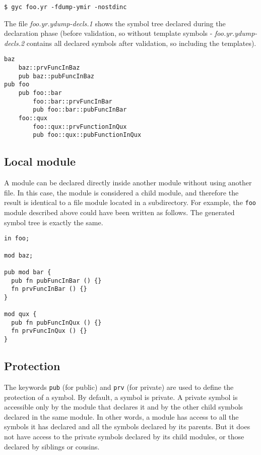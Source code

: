 \begin{lstlisting}[style=intermediateVerb]
$ gyc foo.yr -fdump-ymir -nostdinc
\end{lstlisting}

The file \textit{foo.yr.ydump-decls.1} shows the symbol tree declared during the
declaration phase (before validation, so without template symbols -
\textit{foo.yr.ydump-decls.2} contains all declared symbols after validation, so
including the templates).

\begin{lstlisting}[style=intermediateVerb]
baz
    baz::prvFuncInBaz
    pub baz::pubFuncInBaz
pub foo
    pub foo::bar
        foo::bar::prvFuncInBar
        pub foo::bar::pubFuncInBar
    foo::qux
        foo::qux::prvFunctionInQux
        pub foo::qux::pubFunctionInQux
\end{lstlisting}

\subsection{Local module}

A module can be declared directly inside another module without using another
file. In this case, the module is considered a child module, and therefore the
result is identical to a file module located in a subdirectory. For example, the
\texttt{foo} module described above could have been written as follows. The
generated symbol tree is exactly the same.

\begin{lstlisting}[caption=\textit{./foo.yr}, style=coloredverbatim]
in foo;

mod baz;

pub mod bar {
  pub fn pubFuncInBar () {}
  fn prvFuncInBar () {}
}

mod qux {
  pub fn pubFuncInQux () {}
  fn prvFuncInQux () {}
}
\end{lstlisting}

\subsection{Protection}

The keywords \texttt{pub} (for public) and \texttt{prv} (for private) are used
to define the protection of a symbol. By default, a symbol is private. A private
symbol is accessible only by the module that declares it and by the other child
symbols declared in the same module. In other words, a module has access to all
the symbols it has declared and all the symbols declared by its parents. But it
does not have access to the private symbols declared by its child modules, or
those declared by siblings or cousins.

